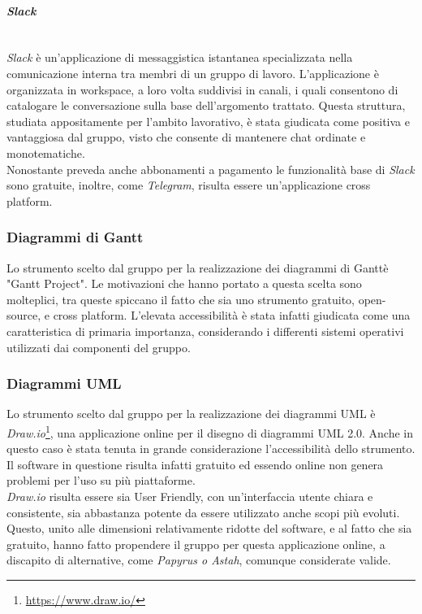 \paragraph{\textit{Slack}} ~\\
	\textit{Slack} è un'applicazione di messaggistica istantanea specializzata nella comunicazione interna tra membri di un gruppo di lavoro. L'applicazione è organizzata in workspace, a loro volta suddivisi in canali, i quali 			consentono di catalogare le conversazione sulla base dell'argomento trattato. Questa struttura, studiata 						appositamente per l'ambito lavorativo, è stata giudicata come positiva e vantaggiosa dal gruppo, visto che 					consente di mantenere chat ordinate e monotematiche.\\
	Nonostante preveda anche abbonamenti a pagamento le funzionalità base di \textit{Slack} sono gratuite, inoltre, come \textit{Telegram}, risulta essere un'applicazione cross platform\glossario.

\subsubsection{Diagrammi di Gantt}
	Lo strumento scelto dal gruppo per la realizzazione dei diagrammi di Gantt\glossario è "Gantt Project". Le 					motivazioni che hanno portato a questa scelta sono molteplici, tra queste spiccano il fatto che sia uno strumento 	gratuito, open-source\glossario, e cross platform. L'elevata accessibilità è stata infatti 				giudicata come una caratteristica di primaria importanza, considerando i differenti sistemi operativi utilizzati 		dai componenti del gruppo.

\subsubsection{Diagrammi UML}
	Lo strumento scelto dal gruppo per la realizzazione dei diagrammi UML è \textit{Draw.io}\footnote{\url{https://www.draw.io/}}, una applicazione online per il disegno di diagrammi UML 2.0. Anche in questo caso è stata tenuta in grande considerazione l'accessibilità dello strumento. Il software in questione risulta infatti gratuito ed essendo online non genera problemi per l'uso su più piattaforme.\\
	\textit{Draw.io} risulta essere sia User Friendly, con un'interfaccia utente chiara e consistente, sia abbastanza potente da essere utilizzato anche scopi più evoluti. Questo, unito alle dimensioni relativamente ridotte del software, e al fatto che sia gratuito, hanno fatto propendere il gruppo per questa applicazione online, a discapito di alternative, come \textit{Papyrus o Astah}, comunque considerate valide.
